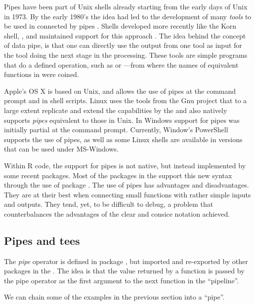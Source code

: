 \documentclass[krantz2,ChapterTOCs]{krantz}\usepackage{knitr}
\begin{document}
Pipes have been part of Unix shells already starting from the early days of Unix in 1973. By the early 1980's the idea had led to the development of many \emph{tools} to be used in  connected by pipes \autocite{Kernigham1981}. Shells developed more recently like the Korn shell, , and  maintained support for this approach \autocite{Rosenblatt1993}. The idea behind the concept of data pipe, is that one can directly use the output from one tool as input for the tool doing the next stage in the processing. These tools are simple programs that do a defined operation, such as  or ---from where the names of equivalent functions in  were coined.

Apple's OS X is based on Unix, and allows the use of pipes at the command prompt and in shell scripts. Linux uses the tools from the Gnu project that to a large extent replicate and extend the capabilities  by the and also natively supports \emph{pipes} equivalent to those in Unix. In Windows support for pipes was initially partial at the command prompt. Currently, Window's PowerShell supports the use of pipes, as well as some Linux shells are available in versions that can be used under MS-Windows.

Within R code, the support for pipes is not native, but instead implemented by some recent packages. Most of the packages in the  support this new syntax through the use of package . The use of pipes has advantages and disadvantages. They are at their best when connecting small functions with rather simple inputs and outputs. They tend, yet, to be difficult to debug, a problem that counterbalances the advantages of the clear and consice notation achieved.

\subsection{Pipes and tees}

The \emph{pipe} operator \Roperator{\%>\%} is defined in package , but imported and re-exported by other packages in the . The idea is that the value returned by a function is passed by the pipe operator as the first argument to the next function in the ``pipeline''.

We can chain some of the examples in the previous section into a ``pipe''.
\end{document}
